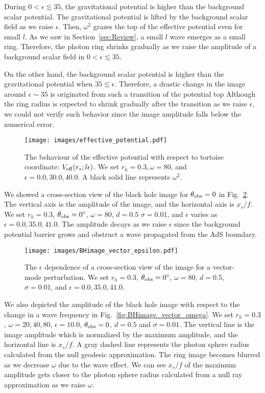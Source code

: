 \documentclass[a4paper,11pt]{article}
\begin{document}
    During $0 < \epsilon \lesssim 35$, the gravitational potential is higher than the background scalar potential. The gravitational potential is lifted  by the background scalar field as we raise $\epsilon$. Then, $\omega^2$ grazes the top of the effective potential even for small $l$. As we saw in Section~\ref{sec:Review}, a small $l$ wave emerges as a small ring. Therefore, the photon ring shrinks gradually as we raise the amplitude of a background scalar field in $0 < \epsilon \lesssim 35$.

    On the other hand, the background scalar potential is higher than the gravitational potential when $35 \lesssim \epsilon$. Therefore, a drastic change in the image around $\epsilon \sim 35$ is originated from such a transition of the potential top  Although the ring radius is expected to shrink gradually after the transition as we raise $\epsilon$, we could not verify such behavior since the image amplitude falls below the numerical error.
\begin{figure}
    \centering
    \texttt{[image: images/effective\_potential.pdf]}
    \caption{The behaviour of the effective potential with respect to tortoise coordinate: $V_{\rm{eff}}(r_*;l\epsilon)$. We set $r_h=0.3, \omega=80$, and $\epsilon=0.0, 30.0, 40.0$. A black solid line represents $\omega^2$.}
    \label{fig:effective_potential}
\end{figure}


    We showed a cross-section view of the black hole image for $\theta_{\rm{obs}}=0$ in Fig.~\ref{fig:BHimage_vector_epsilon}. The vertical axis is the amplitude of the image, and the horizontal axis is $x_s/f$. We set $r_h=0.3$, $\theta_{\rm{obs}}=0^\circ$, $\omega=80$, $d=0.5$  $\sigma=0.01$, and $\epsilon$ varies as $\epsilon=0.0, 35.0, 41.0$. The amplitude decays as we raise $\epsilon$ since the background potential barrier grows and obstruct a wave propagated from the AdS boundary. 
\begin{figure}
    \centering
    \texttt{[image: images/BHimage\_vector\_epsilon.pdf]}
    \caption{The $\epsilon$ dependence of a cross-section view of the image for a vector-mode perturbation. We set $r_h=0.3$, $\theta_{\rm{obs}}=0^\circ$, $\omega=80$, $d=0.5$, $\sigma=0.01$, and $\epsilon=0.0, 35.0, 41.0$.}
    \label{fig:BHimage_vector_epsilon}
\end{figure}

    We also depicted the amplitude of the black hole image with respect to the change in a wave frequency in Fig.~\ref{fig:BHimage_vector_omega}. We set $r_h=0.3$, $\omega=20,40,80$, $\epsilon=10.0$, $\theta_{\rm{obs}}=0$, $d=0.5$ and $\sigma=0.01$.
    The vertical line is the image amplitude which is normalized by the maximum amplitude, and the horizontal line is $x_s/f$. A gray dashed line represents the photon sphere radius calculated from the null geodesic approximation. The ring image becomes blurred as we decrease $\omega$ due to the wave effect. We can see $x_s/f$ of the maximum amplitude gets closer to the photon sphere radius calculated from a null ray approximation as we raise $\omega$.
    
\end{document}
